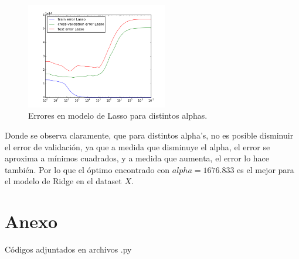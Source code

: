 \documentclass[10pt]{article}
\begin{document}
\begin{itemize}
\begin{figure}[!htb]
   \centering
   \includegraphics[width=0.55\textwidth]{images/comparacion_lasso}
   \caption{Errores en modelo de Lasso para distintos alphas.}
   \label{err:lasso}
\end{figure}

Donde se observa claramente, que para distintos alpha's, no es posible disminuir el error de validación, ya que a medida que disminuye el alpha, el error se aproxima a mínimos cuadrados, y a medida que aumenta, el error lo hace también. Por lo que el óptimo encontrado con $alpha = 1676.833$ es el mejor para el modelo de Ridge en el dataset $X$.


\end{itemize}
 
\section*{Anexo}

\noindent Códigos adjuntados en archivos .py




\end{document}
